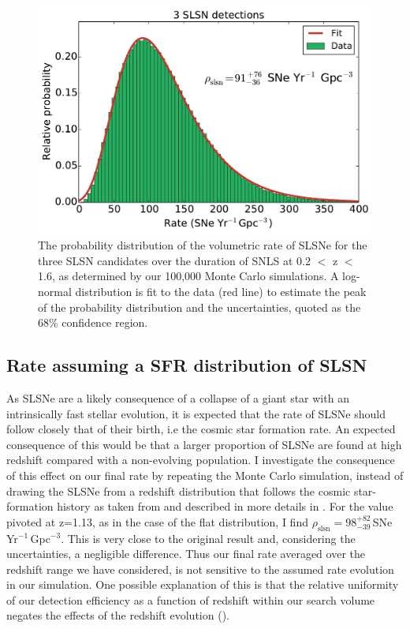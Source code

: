 \begin{figure}
\includegraphics[width=\textwidth]{Figures/Chapter4/rateFlat3}
\caption{The probability distribution of the volumetric rate of SLSNe for the three SLSN candidates over the duration of SNLS at 0.2 $<$ z $<$ 1.6, as determined by our 100,000 Monte Carlo simulations. A log-normal distribution is fit to the data (red line) to estimate the peak of the probability distribution and the uncertainties, quoted as the 68\% confidence region.}
\label{fig:rateFlat3}
\end{figure}

\subsection{Rate assuming a SFR distribution of SLSN}
\label{sec:SFRRate}
As SLSNe are a likely consequence of a collapse of a giant star with an intrinsically fast stellar evolution, it is expected that the rate of SLSNe should follow closely that of their birth, i.e the cosmic star formation rate. An expected consequence of this would be that a larger proportion of SLSNe are found at high redshift compared with a non-evolving population. I investigate the consequence of this effect on our final rate by repeating the Monte Carlo simulation, instead of drawing the SLSNe from a redshift distribution that follows the cosmic star-formation history as taken from \citet{Hopkins2006} and described in more details in . For the value pivoted at z=1.13, as in the case of the flat distribution, I find $\rho_{\mathrm{slsn}} = 98^{+82}_{-39}$\,SNe\,Yr$^{-1}$\,Gpc$^{-3}$. This is very close to the original result and, considering the uncertainties, a negligible difference. Thus our final rate averaged over the redshift range we have considered, is not sensitive to the assumed rate evolution in our simulation. One possible explanation of this is that the relative uniformity of our detection efficiency as a function of redshift within our search volume negates the effects of the redshift evolution ().

